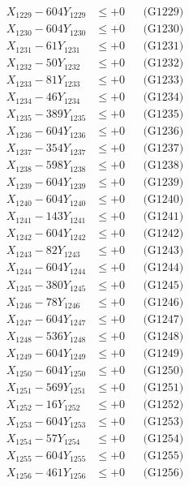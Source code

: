 \documentclass[a4paper,10pt]{article}
\begin{document}
{\begin{align}
X_{1229} - 604Y_{1229} &\leq +0 && \text{(G1229)} \\
X_{1230} - 604Y_{1230} &\leq +0 && \text{(G1230)} \\
\allowbreak
X_{1231} - 61Y_{1231} &\leq +0 && \text{(G1231)} \\
X_{1232} - 50Y_{1232} &\leq +0 && \text{(G1232)} \\
X_{1233} - 81Y_{1233} &\leq +0 && \text{(G1233)} \\
X_{1234} - 46Y_{1234} &\leq +0 && \text{(G1234)} \\
X_{1235} - 389Y_{1235} &\leq +0 && \text{(G1235)} \\
X_{1236} - 604Y_{1236} &\leq +0 && \text{(G1236)} \\
X_{1237} - 354Y_{1237} &\leq +0 && \text{(G1237)} \\
X_{1238} - 598Y_{1238} &\leq +0 && \text{(G1238)} \\
X_{1239} - 604Y_{1239} &\leq +0 && \text{(G1239)} \\
X_{1240} - 604Y_{1240} &\leq +0 && \text{(G1240)} \\
\allowbreak
X_{1241} - 143Y_{1241} &\leq +0 && \text{(G1241)} \\
X_{1242} - 604Y_{1242} &\leq +0 && \text{(G1242)} \\
X_{1243} - 82Y_{1243} &\leq +0 && \text{(G1243)} \\
X_{1244} - 604Y_{1244} &\leq +0 && \text{(G1244)} \\
X_{1245} - 380Y_{1245} &\leq +0 && \text{(G1245)} \\
X_{1246} - 78Y_{1246} &\leq +0 && \text{(G1246)} \\
X_{1247} - 604Y_{1247} &\leq +0 && \text{(G1247)} \\
X_{1248} - 536Y_{1248} &\leq +0 && \text{(G1248)} \\
X_{1249} - 604Y_{1249} &\leq +0 && \text{(G1249)} \\
X_{1250} - 604Y_{1250} &\leq +0 && \text{(G1250)} \\
\allowbreak
X_{1251} - 569Y_{1251} &\leq +0 && \text{(G1251)} \\
X_{1252} - 16Y_{1252} &\leq +0 && \text{(G1252)} \\
X_{1253} - 604Y_{1253} &\leq +0 && \text{(G1253)} \\
X_{1254} - 57Y_{1254} &\leq +0 && \text{(G1254)} \\
X_{1255} - 604Y_{1255} &\leq +0 && \text{(G1255)} \\
X_{1256} - 461Y_{1256} &\leq +0 && \text{(G1256)} \\

\end{align}}
\end{document}
